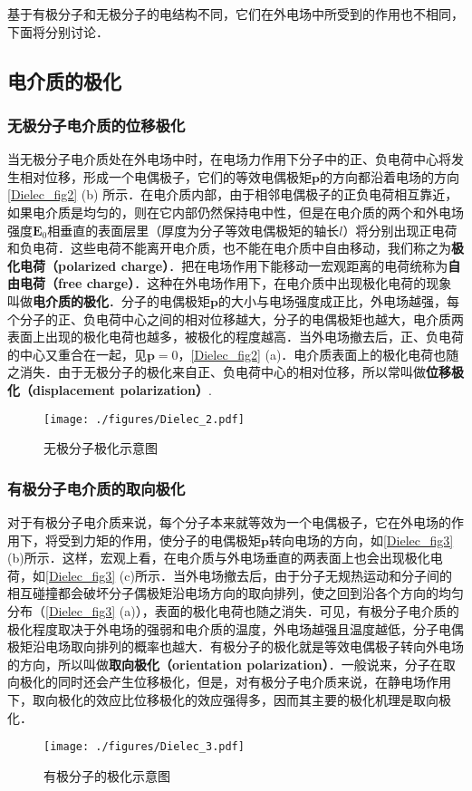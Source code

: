 基于有极分子和无极分子的电结构不同，它们在外电场中所受到的作用也不相同，下面将分别讨论．

\subsection{电介质的极化}

\subsubsection{无极分子电介质的位移极化}

当无极分子电介质处在外电场中时，在电场力作用下分子中的正、负电荷中心将发生相对位移，形成一个电偶极子，它们的等效电偶极矩$\mathbf p$的方向都沿着电场的方向\autoref{Dielec_fig2} (b) 所示．在电介质内部，由于相邻电偶极子的正负电荷相互靠近，如果电介质是均匀的，则在它内部仍然保持电中性，但是在电介质的两个和外电场强度$\mathbf E_0$相垂直的表面层里（厚度为分子等效电偶极矩的轴长$l$）将分别出现正电荷和负电荷．这些电荷不能离开电介质，也不能在电介质中自由移动，我们称之为\textbf{极化电荷（polarized charge）}．把在电场作用下能移动一宏观距离的电荷统称为\textbf{自由电荷（free charge）}．这种在外电场作用下，在电介质中出现极化电荷的现象叫做\textbf{电介质的极化}．分子的电偶极矩$\mathbf p $的大小与电场强度成正比，外电场越强，每个分子的正、负电荷中心之间的相对位移越大，分子的电偶极矩也越大，电介质两表面上出现的极化电荷也越多，被极化的程度越高．当外电场撤去后，正、负电荷的中心又重合在一起，见$\mathbf p=0$，\autoref{Dielec_fig2} (a)．电介质表面上的极化电荷也随之消失．由于无极分子的极化来自正、负电荷中心的相对位移，所以常叫做\textbf{位移极化（displacement polarization）}.
\begin{figure}[ht]
\centering
\texttt{[image: ./figures/Dielec\_2.pdf]}
\caption{无极分子极化示意图} \label{Dielec_fig2}
\end{figure}

\subsubsection{有极分子电介质的取向极化}

对于有极分子电介质来说，每个分子本来就等效为一个电偶极子，它在外电场的作用下，将受到力矩的作用，使分子的电偶极矩$\mathbf p$转向电场的方向，如\autoref{Dielec_fig3} (b)所示．这样，宏观上看，在电介质与外电场垂直的两表面上也会出现极化电荷，如\autoref{Dielec_fig3} (c)所示．当外电场撤去后，由于分子无规热运动和分子间的相互碰撞都会破坏分子偶极矩沿电场方向的取向排列，使之回到沿各个方向的均匀分布（\autoref{Dielec_fig3} (a)），表面的极化电荷也随之消失．可见，有极分子电介质的极化程度取决于外电场的强弱和电介质的温度，外电场越强且温度越低，分子电偶极矩沿电场取向排列的概率也越大．有极分子的极化就是等效电偶极子转向外电场的方向，所以叫做\textbf{取向极化（orientation polarization）}．一般说来，分子在取向极化的同时还会产生位移极化，但是，对有极分子电介质来说，在静电场作用下，取向极化的效应比位移极化的效应强得多，因而其主要的极化机理是取向极化．
\begin{figure}[ht]
\centering
\texttt{[image: ./figures/Dielec\_3.pdf]}
\caption{有极分子的极化示意图} \label{Dielec_fig3}
\end{figure}


